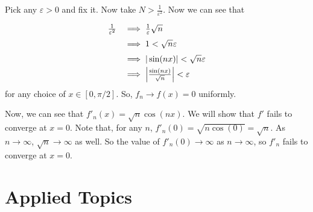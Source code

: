 \documentclass[11pt]{article}
\begin{document}
Pick any $\varepsilon>0$ and fix it. Now take $N>\frac{1}{\varepsilon^2}$.
Now we can see that
\[
\def\arraystretch{1.5}
\begin{array}{rl}
\frac{1}{\varepsilon^2} &\implies \frac{1}{\varepsilon}\sqrt{n} \\
&\implies 1<\sqrt{n}\varepsilon \\
&\implies |\sin(nx)|<\sqrt{n}\varepsilon \\
&\implies \left| \frac{\sin(nx)}{\sqrt{n}}\right| < \varepsilon
\end{array}
\]
for any choice of $x\in[0,\pi/2]$. So, $f_n\to f(x)=0$ uniformly.

Now, we can see that $f'_n(x) = \sqrt{n}\cos(nx)$. We will show that
$f'$ fails to converge at $x=0$. Note that, for any $n$,
$f'_n(0)=\sqrt{n\cos(0)}=\sqrt{n}$. As $n\to\infty$, $\sqrt{n}\to\infty$ as well.
So the value of $f'_n(0)\to\infty$ as $n\to\infty$, so $f'_n$ fails to converge
at $x=0$. 

\section*{Applied Topics}
\end{document}
